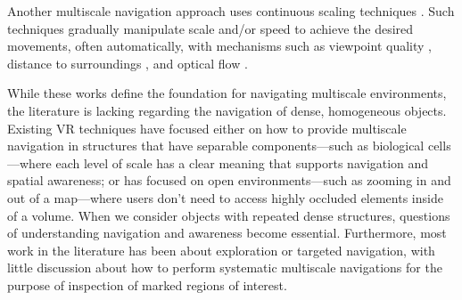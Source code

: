 Another multiscale navigation approach uses continuous scaling techniques \cite{al_zayer_virtual_2020}. Such techniques gradually manipulate scale and/or speed \cite{mccrae_multiscale_2009, argelaguet_adaptive_2014} to achieve the desired movements, often automatically, with mechanisms such as viewpoint quality \cite{freitag_automatic_2016, mirhosseini_automatic_2017}, distance to surroundings \cite{ware_context_1997, mccrae_multiscale_2009, trindade_improving_2011, carvalho_dynamic_2011, cho_evaluating_2014, cho_multi-scale_2018}, and optical flow \cite{argelaguet_adaptive_2014, argelaguet_giant_2016}.

While these works define the foundation for navigating multiscale environments, the literature is lacking regarding the navigation of dense, homogeneous objects. Existing VR techniques have focused either on how to provide multiscale navigation in structures that have separable components---such as biological cells---where each level of scale has a clear meaning that supports navigation and spatial awareness; or has focused on open environments—such as zooming in and out of a map—where users don’t need to access highly occluded elements inside of a volume. When we consider objects with repeated dense structures, questions of understanding navigation and awareness become essential. Furthermore, most work in the literature has been about exploration or targeted navigation, with little discussion about how to perform systematic multiscale navigations for the purpose of inspection of marked regions of interest.

